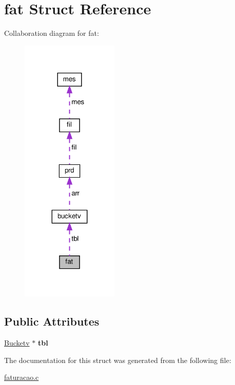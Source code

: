 \hypertarget{structfat}{}\section{fat Struct Reference}
\label{structfat}


Collaboration diagram for fat\+:
\nopagebreak
\begin{figure}[H]
\begin{center}
\leavevmode
\includegraphics[width=131pt]{structfat__coll__graph}
\end{center}
\end{figure}
\subsection*{Public Attributes}
\begin{DoxyCompactItemize}
\item 
\mbox{\label{structfat_a2e88d3f6590a682cd4fd5bac64172eed}} 
\hyperlink{structbucketv}{Bucketv} $\ast$ {\bfseries tbl}
\end{DoxyCompactItemize}


The documentation for this struct was generated from the following file\+:\begin{DoxyCompactItemize}
\item 
\hyperlink{faturacao_8c}{faturacao.\+c}\end{DoxyCompactItemize}
